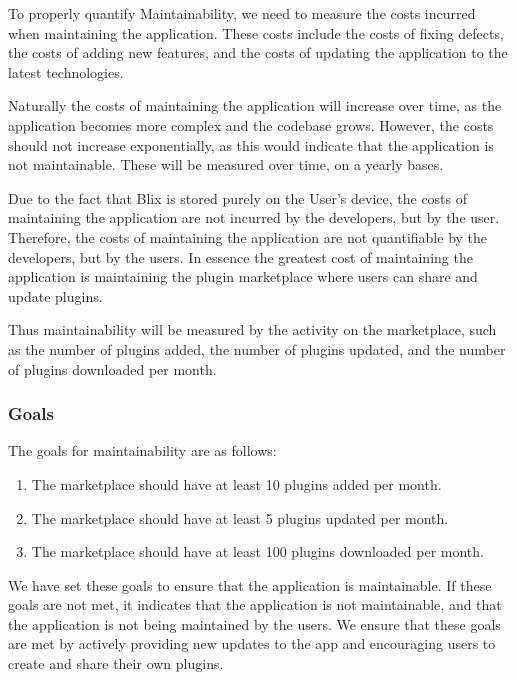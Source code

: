 \documentclass[11pt,a4paper]{article}
\begin{document}
To properly quantify Maintainability, we need to measure the costs incurred when maintaining the application. These costs include the costs of fixing defects, the costs of adding new features, and the costs of updating the application to the latest technologies.

Naturally the costs of maintaining the application will increase over time, as the application becomes more complex and the codebase grows. However, the costs should not increase exponentially, as this would indicate that the application is not maintainable.
These will be measured over time, on a yearly bases. 

Due to the fact that Blix is stored purely on the User's device, the costs of maintaining the application are not incurred by the developers, but by the user. Therefore, the costs of maintaining the application are not quantifiable by the developers, but by the users.
In essence the greatest cost of maintaining the application is maintaining the plugin marketplace where users can share and update plugins. 

Thus maintainability will be measured by the activity on the marketplace, such as the number of plugins added, the number of plugins updated, and the number of plugins downloaded per month.

\subsubsection*{Goals}

The goals for maintainability are as follows:

\begin{enumerate}
  \item The marketplace should have at least 10 plugins added per month.
  \item The marketplace should have at least 5 plugins updated per month.
  \item The marketplace should have at least 100 plugins downloaded per month.
\end{enumerate}

We have set these goals to ensure that the application is maintainable. If these goals are not met, it indicates that the application is not maintainable, 
and that the application is not being maintained by the users. We ensure that these goals are met by actively providing new updates to the app and 
encouraging users to create and share their own plugins.
\end{document}
